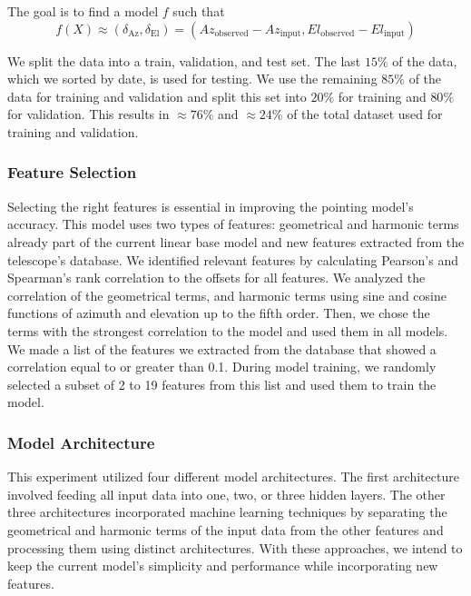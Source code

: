 The goal is to find a model $f$ such that
\begin{equation}
    f(X) \approx (\delta_{\text{Az}}, \delta_{\text{El}}) = (Az_{\text{observed}}-Az_{\text{input}}, El_{\text{observed}}-El_{\text{input}})
\end{equation}

We split the data into a train, validation, and test set.
The last $15\%$ of the data, which we sorted by date, is used for testing.
We use the remaining $85\%$ of the data for training and validation and split this set into $20\%$ for training and $80\%$ for validation.
This results in $\approx 76\%$ and $\approx 24\%$ of the total dataset used for training and validation.

\subsubsection{Feature Selection}
Selecting the right features is essential in improving the pointing model's accuracy.
This model uses two types of features: geometrical and harmonic terms already part of the current linear base model and new features extracted from the telescope's database.
We identified relevant features by calculating Pearson's and Spearman's rank correlation to the offsets for all features.
We analyzed the correlation of the geometrical terms, and harmonic terms using sine and cosine functions of azimuth and elevation up to the fifth order.
Then, we chose the terms with the strongest correlation to the model and used them in all models.
We made a list of the features we extracted from the database that showed a correlation equal to or greater than 0.1.
During model training, we randomly selected a subset of 2 to 19 features from this list and used them to train the model.

\subsubsection{Model Architecture}
This experiment utilized four different model architectures.
The first architecture involved feeding all input data into one, two, or three hidden layers.
The other three architectures incorporated machine learning techniques by separating the geometrical and harmonic terms of the input data from the other features and processing them using distinct architectures.
With these approaches, we intend to keep the current model's simplicity and performance while incorporating new features.

